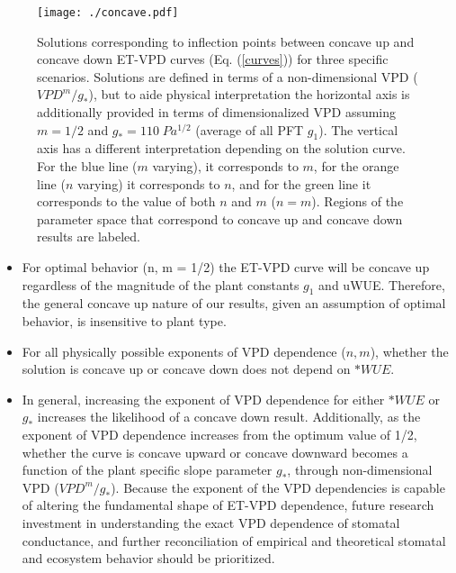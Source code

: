 \documentclass[draft]{agujournal2019}
\begin{document}
\begin{figure}
  \centering
  \centerline{\texttt{[image: ./concave.pdf]}}
  \caption{ Solutions corresponding to inflection points between
    concave up and concave down ET-VPD curves (Eq. (\ref{curves}))
    for three specific scenarios. Solutions are defined in terms of a
    non-dimensional VPD ($VPD^m/g_*$), but to aide physical
    interpretation the horizontal axis is additionally provided in terms of dimensionalized VPD assuming $m=1/2$ and
    $g_*=110\; Pa^{1/2}$ (average of all PFT $g_1$). The vertical axis
    has a different interpretation depending on the solution
    curve. For the blue line ($m$ varying), it corresponds to $m$,
    for the orange line ($n$ varying) it corresponds to $n$, and for
    the green line it corresponds to the value of both $n$ and $m$
    ($n=m$). Regions of the parameter space that correspond to
    concave up and concave down results are labeled.}
  \label{concave}
\end{figure}

\begin{itemize}
  \item For optimal behavior (n, m = 1/2) the ET-VPD curve will be
    concave up regardless of the magnitude of the plant constants
    $g_1$ and uWUE. Therefore, the general concave up nature of our
    results, given an assumption of optimal behavior, is insensitive
    to plant type.
  \item For all physically possible exponents of VPD dependence ($n,
    m$), whether the solution is concave up or concave down does not
    depend on $*WUE$.
  \item In general, increasing the exponent of VPD dependence for
    either $*WUE$ or $g_*$ increases the likelihood of a concave down
    result. Additionally, as the exponent of VPD dependence increases
    from the optimum value of 1/2, whether the curve is concave upward
    or concave downward becomes a function of the plant specific slope
    parameter $g_*$, through non-dimensional VPD
    ($VPD^m/g_*$). Because the exponent of the VPD dependencies is
    capable of altering the fundamental shape of ET-VPD dependence,
    future research investment in understanding the exact VPD
    dependence of stomatal conductance, and further reconciliation of
    empirical and theoretical stomatal and ecosystem behavior should
    be prioritized.
\end{itemize}
\end{document}
